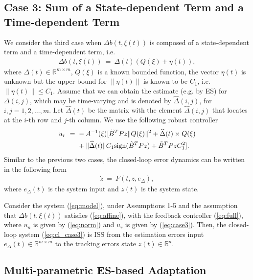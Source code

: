 \documentclass[twoside,leqno,onecolumn]{article}
\begin{document}
\subsection{Case 3: Sum of a State-dependent Term and a Time-dependent Term}
\label{sec:case3} We consider the third case when $\Delta b
(t,\xi(t))$ is composed of a  state-dependent term and a
time-dependent term, i.e.
\begin{align}
\label{eq:affine} \Delta b (t,\xi(t))~=~\Delta(t) (Q(\xi) +
\eta(t)),
\end{align}
where $\Delta(t)\in\mathbb{R}^{m\times m}$, $Q(\xi)$ is a known
bounded function, the vector $\eta(t)$ is unknown but the upper
bound for $\|\eta(t)\|$ is known to be $C_1$, i.e.
$\|\eta(t)\|\leq C_1$. Assume that we can obtain the estimate
(e.g. by ES) for $\Delta(i,j)$, which may be time-varying and is
denoted by $\widehat{\Delta}(i,j)$, for $i,j = 1,2,\dots,m$. Let
$\widehat{\Delta}(t)$
be the matrix with the element $\widehat{\Delta}(i,j)$ that locates at the $i$-th row and $j$-th column.
We use the following robust controller
\begin{align}
\label{eq:case3}
u_{r}~=~&-A^{-1}(\xi)[\tilde B^TPz\|Q(\xi)\|^2 +\widehat{\Delta}(t)\times Q(\xi)\notag\\
 &+\|\widehat \Delta(t)\| C_1{\rm{sign} }  (\tilde B^TPz) +\tilde B^TPzC_1^2].
\end{align}
Similar to the previous two cases, the closed-loop error dynamics
can be written in the following form
\begin{align}
\label{eq:cl_case3} \dot{z}~=~F(t,z,e_\Delta),
\end{align}
where $e_\Delta(t)$ is the system input and $z(t)$ is the system
state.






\begin{theorem}
\label{thm:case3} Consider the system (\ref{eq:model}), under
Assumptions 1-5 and the assumption that $\Delta b(t,\xi(t))$
satisfies (\ref{eq:affine}), with the feedback controller
(\ref{eq:full}), where $u_n$ is given by (\ref{eq:norm}) and $u_r$
is given by (\ref{eq:case3}). Then, the closed-loop system
(\ref{eq:cl_case3}) is ISS from the estimation errors input
$e_\Delta(t)\in\mathbb{R}^{m\times m}$ to the tracking errors
state $z(t)\in\mathbb{R}^n$.
\end{theorem}


\subsection{Multi-parametric ES-based Adaptation} \label{sec:ES}
\end{document}
